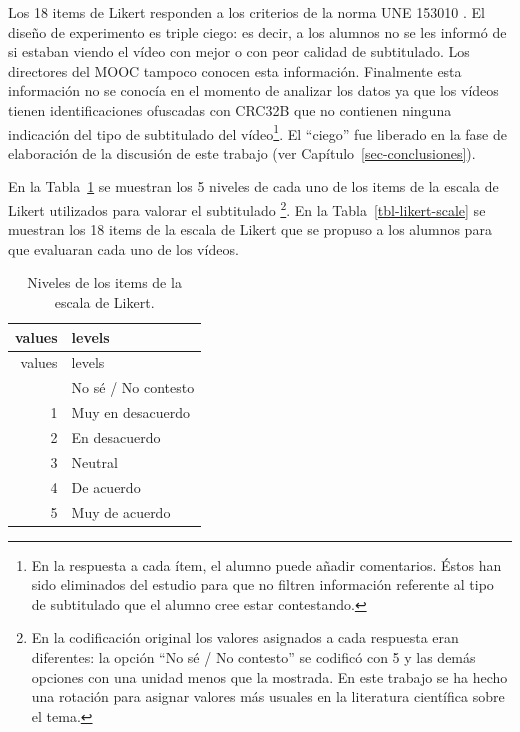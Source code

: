 \documentclass[
  12pt,
  a4paper,
  extrafontsizes,
  onecolumn,
  openright,
  table]{memoir}
\begin{document}
Los 18 items de Likert responden a los criterios de la norma UNE 153010
\autocite[ver][]{aenor2012}. El diseño de experimento es triple ciego:
es decir, a los alumnos no se les informó de si estaban viendo el vídeo
con mejor o con peor calidad de subtitulado. Los directores del MOOC
tampoco conocen esta información. Finalmente esta información no se
conocía en el momento de analizar los datos ya que los vídeos tienen
identificaciones ofuscadas con CRC32B que no contienen ninguna
indicación del tipo de subtitulado del vídeo\footnote{En la respuesta a
  cada ítem, el alumno puede añadir comentarios. Éstos han sido
  eliminados del estudio para que no filtren información referente al
  tipo de subtitulado que el alumno cree estar contestando.}. El
\enquote{ciego} fue liberado en la fase de elaboración de la discusión
de este trabajo (ver Capítulo~\ref{sec-conclusiones}).

En la Tabla~\ref{tbl-likert-levels} se muestran los 5 niveles de cada
uno de los items de la escala de Likert utilizados para valorar el
subtitulado \footnote{En la codificación original los valores asignados
  a cada respuesta eran diferentes: la opción \enquote{No sé / No
  contesto} se codificó con 5 y las demás opciones con una unidad menos
  que la mostrada. En este trabajo se ha hecho una rotación para asignar
  valores más usuales en la literatura científica sobre el tema.}. En la
Tabla~\ref{tbl-likert-scale} se muestran los 18 items de la escala de
Likert que se propuso a los alumnos para que evaluaran cada uno de los
vídeos.

\hypertarget{tbl-likert-levels}{}
\begin{longtable}[]{@{}rl@{}}
\caption{\label{tbl-likert-levels}Niveles de los items de la escala de
Likert.}\tabularnewline
\toprule\noalign{}
values & levels \\
\midrule\noalign{}
\endfirsthead
\toprule\noalign{}
values & levels \\
\midrule\noalign{}
\endhead
\bottomrule\noalign{}
\endlastfoot
0 & No sé / No contesto \\
1 & Muy en desacuerdo \\
2 & En desacuerdo \\
3 & Neutral \\
4 & De acuerdo \\
5 & Muy de acuerdo \\
\end{longtable}
\end{document}
